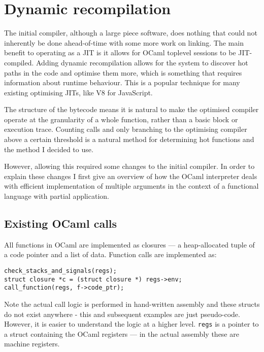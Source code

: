 \section{Dynamic recompilation} \label{dyn-recomp}

The initial compiler, although a large piece software, does nothing that could not inherently be
done ahead-of-time with some more work on linking. The main benefit to operating as a JIT is it
allows for OCaml toplevel sessions to be JIT-compiled. Adding dynamic recompilation allows for the
system to discover hot paths in the code and optimise them more, which is something that requires
information about runtime behaviour. This is a popular technique for many existing optimising JITs,
like V8 for JavaScript.

The structure of the bytecode means it is natural to make the optimised compiler operate at the
granularity of a whole function, rather than a basic block or execution trace. Counting calls and
only branching to the optimising compiler above a certain threshold is a natural method for
determining hot functions and the method I decided to use.

However, allowing this required some changes to the initial compiler. In order to explain these
changes I first give an overview of how the OCaml interpreter deals with efficient
implementation of multiple arguments in the context of a functional language with partial
application.

\subsection{Existing OCaml calls} \label{exist-ocaml}

All functions in OCaml are implemented as closures --- a heap-allocated tuple of a code pointer and
a
list of data. Function calls are implemented as:

\begin{verbatim}
check_stacks_and_signals(regs);
struct closure *c = (struct closure *) regs->env;
call_function(regs, f->code_ptr);
\end{verbatim}

Note the actual call logic is performed in hand-written assembly and these structs do not exist
anywhere
- this and subsequent examples are just pseudo-code. However, it is easier to understand the logic
at a higher level. \texttt{regs} is a pointer to a struct containing the OCaml registers --- in the
actual assembly these are machine registers.

